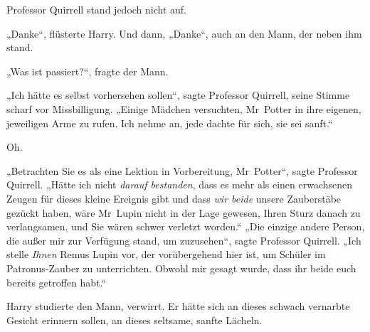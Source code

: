 Professor Quirrell stand jedoch nicht auf.

„Danke“, flüsterte Harry. Und dann,
„Danke“, auch an den Mann, der neben ihm stand.

„Was ist passiert?“, fragte der Mann.

„Ich hätte es selbst vorhersehen sollen“, sagte Professor Quirrell, seine Stimme scharf vor Missbilligung.
„Einige Mädchen versuchten, Mr~Potter in ihre eigenen, jeweiligen Arme zu rufen. Ich nehme an, jede dachte für sich, sie sei sanft.“

Oh.

„Betrachten Sie es als eine Lektion in Vorbereitung, Mr~Potter“, sagte Professor Quirrell.
„Hätte ich nicht \emph{darauf bestanden}, dass es mehr als einen erwachsenen Zeugen für dieses kleine Ereignis gibt und dass \emph{wir beide} unsere Zauberstäbe gezückt haben, wäre Mr~Lupin nicht in der Lage gewesen, Ihren Sturz danach zu verlangsamen, und Sie wären schwer verletzt worden.“
„Die einzige andere Person, die außer mir zur Verfügung stand, um zuzusehen“, sagte Professor Quirrell.
„Ich stelle \emph{Ihnen} Remus Lupin vor, der vorübergehend hier ist, um Schüler im Patronus-Zauber zu unterrichten. Obwohl mir gesagt wurde, dass ihr beide euch bereits getroffen habt.“

Harry studierte den Mann, verwirrt. Er hätte sich an dieses schwach vernarbte Gesicht erinnern sollen, an dieses seltsame, sanfte Lächeln.


